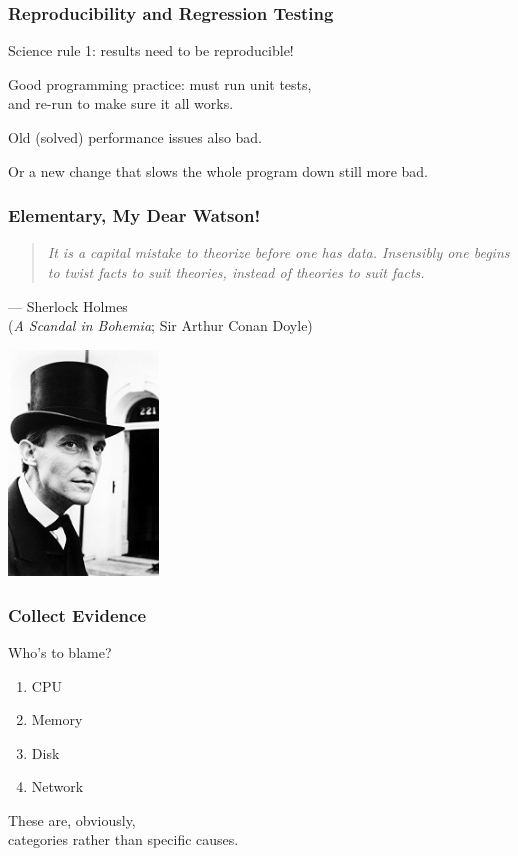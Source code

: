 \begin{frame}
\frametitle{Reproducibility and Regression Testing}


\begin{changemargin}{2cm}
Science rule 1: results need to be reproducible!

Good programming practice: must run unit tests,\\
and re-run to make sure it all works. 

Old (solved) performance issues also bad.

Or a new change that slows the whole program down still more bad.
\end{changemargin}
\end{frame}



\begin{frame}
\frametitle{Elementary, My Dear Watson!}


\begin{changemargin}{1cm}
\begin{quote}
\textit{It is a capital mistake to theorize before one has data. Insensibly one begins to twist facts to suit theories, instead of theories to suit facts.}
\end{quote}
\hfill --- Sherlock Holmes\\
\hfill (\textit{A Scandal in Bohemia}; Sir Arthur Conan Doyle)
\end{changemargin}

\begin{center}
	\includegraphics[width=0.3\textwidth]{images/jeremybrett.jpg}
\end{center}

\end{frame}



\begin{frame}
\frametitle{Collect Evidence}


\begin{changemargin}{1cm}
Who's to blame?
\begin{enumerate}
	\item CPU
	\item Memory
	\item Disk
	\item Network
\end{enumerate}

These are, obviously, \\
categories rather than specific causes.
\end{changemargin}
\end{frame}



